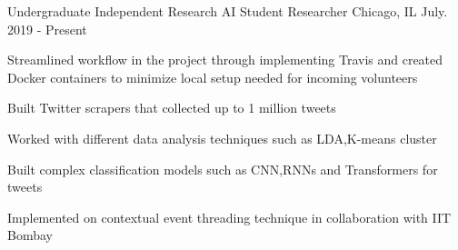 \begin{cventries}
  \cventry
    {Undergraduate Independent Research} %
    {AI Student Researcher} %
    {Chicago, IL} %
    {July. 2019 - Present} %
    {
      \begin{cvitems} %
        \item {Streamlined workflow in the project through implementing Travis and created Docker containers to minimize local setup needed for incoming volunteers}
        \item {Built Twitter scrapers that collected up to 1 million tweets}
        \item {Worked with different data analysis techniques such as LDA,K-means cluster}
        \item {Built complex classification models such as CNN,RNNs and Transformers for tweets}
        \item {Implemented on contextual event threading technique in collaboration with IIT Bombay}
      \end{cvitems}
    }

\end{cventries}
